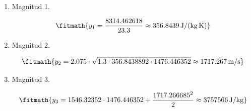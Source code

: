 \begin{enumerate}

\item Magnitud 1.

\[\fitmath{y_{1}=\frac{8314.462618}{23.3}\approx 356.8439\,\mathrm{J/(kg\,K)}}\]

\item Magnitud 2.

\[\fitmath{y_{2}=2.075\cdot \sqrt{1.3\cdot 356.8438892\cdot 1476.446352}\approx 1717.267\,\mathrm{m/s}}\]

\item Magnitud 3.

\[\fitmath{y_{3}=1546.32352\cdot 1476.446352+\frac{{1717.266685}^{2}}{2}\approx 3757566\,\mathrm{J/kg}}\]

\end{enumerate}
